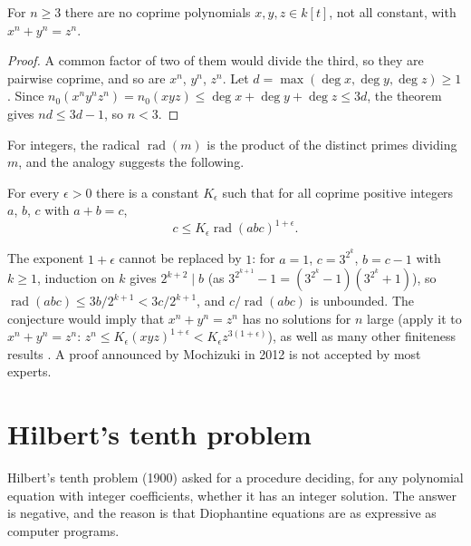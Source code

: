 \begin{corollary}\label{diophantine-equations:corollary-flt-polynomials}
For $n \geq 3$ there are no coprime polynomials $x, y, z \in k[t]$, not all constant, with $x^n + y^n = z^n$.
\end{corollary}

\begin{proof}
A common factor of two of them would divide the third, so they are pairwise coprime, and so are $x^n$, $y^n$, $z^n$. Let $d = \max(\deg x, \deg y, \deg z) \geq 1$. Since
$n_0(x^ny^nz^n) = n_0(xyz) \leq \deg x + \deg y + \deg z \leq 3d$, the theorem gives $nd \leq 3d - 1$, so $n < 3$.
\end{proof}

For integers, the radical $\operatorname{rad}(m)$ is the product of the distinct primes dividing $m$, and the analogy suggests the following.

\begin{conjecture}\label{diophantine-equations:conjecture-abc}
For every $\epsilon > 0$ there is a constant $K_\epsilon$ such that for all coprime positive integers $a$, $b$, $c$ with $a + b = c$,
\[
c \leq K_\epsilon\operatorname{rad}(abc)^{1 + \epsilon}.
\]
\end{conjecture}

\begin{remark}\label{diophantine-equations:remark-abc}
The exponent $1 + \epsilon$ cannot be replaced by $1$: for $a = 1$, $c = 3^{2^k}$, $b = c - 1$ with $k \geq 1$, induction on $k$ gives $2^{k + 2} \mid b$ (as $3^{2^{k+1}} - 1 = (3^{2^k} - 1)(3^{2^k} + 1)$), so $\operatorname{rad}(abc) \leq 3b/2^{k + 1} < 3c/2^{k + 1}$, and
$c/\operatorname{rad}(abc)$ is unbounded. The conjecture would imply that $x^n + y^n = z^n$ has no solutions for $n$ large (apply it to $x^n + y^n = z^n$: $z^n \leq K_\epsilon(xyz)^{1 + \epsilon} < K_\epsilon z^{3(1 + \epsilon)}$),
as well as many other finiteness results \cite{granville-tucker-abc}. A proof announced by Mochizuki in 2012 is not accepted by most experts.
\end{remark}

\section{Hilbert's tenth problem}\label{diophantine-equations:section-hilbert-tenth}

Hilbert's tenth problem (1900) asked for a procedure deciding, for any polynomial equation with integer coefficients, whether it has an integer solution. The answer is negative, and the reason is that
Diophantine equations are as expressive as computer programs.

